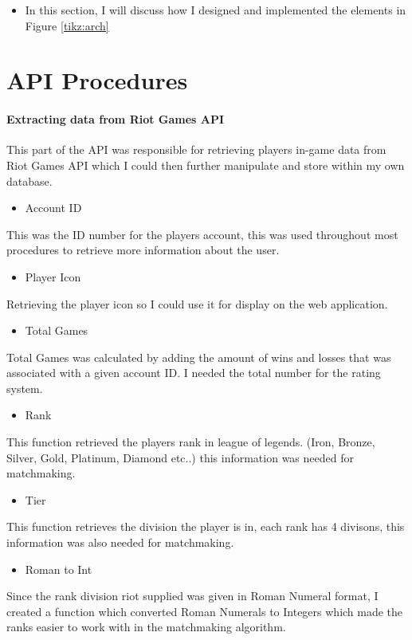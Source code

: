 \begin{itemize}
	\item In this section, I will discuss how I designed and implemented the elements in Figure \ref{tikz:arch}
\end{itemize}

\newpage
\section{API Procedures}

\paragraph{Extracting data from Riot Games API}
This part of the API was responsible for retrieving players in-game data from Riot Games API which I could then further manipulate and store within my own database.
\begin{itemize}
	\item Account ID
\end{itemize}
This was the ID number for the players account, this was used throughout most procedures to retrieve more information about the user.
\begin{itemize}
	\item Player Icon
\end{itemize}
Retrieving the player icon so I could use it for display on the web application.
\begin{itemize}
	\item Total Games
\end{itemize}
Total Games was calculated by adding the amount of wins and losses that was associated with a given account ID. I needed the total number for the rating system.
\begin{itemize}
	\item Rank
\end{itemize}
This function retrieved the players rank in league of legends.
(Iron, Bronze, Silver, Gold, Platinum, Diamond etc..) this information was needed for matchmaking.
\begin{itemize}
	\item Tier
\end{itemize}
This function retrieves the division the player is in, each rank has 4 divisons, this information was also needed for matchmaking.
\begin{itemize}
	\item Roman to Int
\end{itemize}
Since the rank division riot supplied was given in Roman Numeral format, I created a function which converted Roman Numerals to Integers which made the ranks easier to work with in the matchmaking algorithm.

